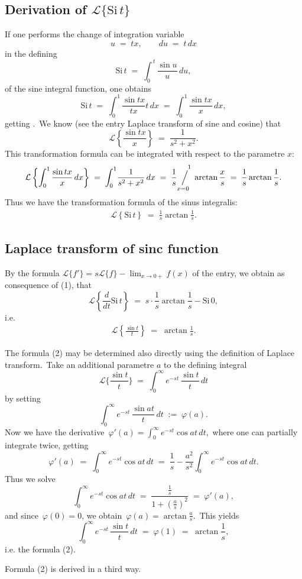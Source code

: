 \documentclass[12pt]{article}
\newcommand{\sijoitus}[2]%
{\operatornamewithlimits{\Big/}_{\!\!\!#1}^{\,#2}}
\begin{document}
  
\subsection{Derivation of $\mathcal{L}\{\mathrm{Si}\,t\}$}

If one performs the change of integration variable
$$u \;=\; tx, \qquad du \;=\; t\,dx$$
in the defining 
$$\mathrm{Si}\,t \;=\; \int_0^{\,t}\!\frac{\sin{u}}{u}\,du,$$
of the sine integral function, one obtains
$$\mathrm{Si}\,t \;=\; \int_0^1\frac{\sin{tx}}{tx}t\,dx \;=\; \int_0^1\frac{\sin{tx}}{x}\,dx,$$
getting  .\, We know (see the entry Laplace transform of sine and cosine) that
$$\mathcal{L}\left\{\frac{\sin{tx}}{x}\right\} \;=\; 
\frac{1}{s^2+x^2}.$$
This transformation formula can be integrated with respect to the parametre $x$:
$$\mathcal{L}\left\{\int_0^1\frac{\sin{tx}}{x}\,dx\right\} 
\;=\; \int_0^1\!\frac{1}{s^2+x^2}\,dx \;=\;
\frac{1}{s}\sijoitus{x=0}{\quad 1}\;\arctan\frac{x}{s} \;=\; 
\frac{1}{s}\arctan\frac{1}{s}.$$
Thus we have the transformation formula of the sinus integralis:
\begin{align}
\mathcal{L}\left\{\mathrm{Si}\,t\right\} \;=\; \frac{1}{s}\arctan\frac{1}{s}.
\end{align}

\subsection{Laplace transform of sinc function}

By the formula \;$\mathcal{L}\{f'\} = s \mathcal{L}\{f\}-\lim_{x \to 0+}f(x)$\; of the  entry,
we obtain as consequence of (1), that
$$\mathcal{L}\left\{\frac{d}{dt}\mathrm{Si}\,t\right\} \;=\; s\cdot\frac{1}{s}\arctan\frac{1}{s}-\mathrm{Si}\,0,$$
i.e.
\begin{align}
\mathcal{L}\left\{\frac{\sin{t}}{t}\right\} \;=\; \arctan\frac{1}{s}.
\end{align}


The formula (2) may be determined also directly using the definition of Laplace transform.\, Take an additional parametre $a$ to the defining integral 
$$\mathcal{L}\{\frac{\sin{t}}{t}\} \;=\; \int_0^\infty e^{-st}\,\frac{\sin t}{t}\,dt$$
by setting
$$\int_0^\infty e^{-st}\,\frac{\sin{at}}{t}\,dt \;:=\; \varphi(a).$$
Now we have the derivative \,$\varphi'(a) = \int_0^\infty e^{-st}\cos{at}\,dt$,\, where one can partially integrate twice, getting 
$$\varphi'(a) \;=\; \int_0^\infty e^{-st}\cos{at}\,dt \;=\; \frac{1}{s}-\frac{a^2}{s^2}\int_0^\infty e^{-st}
\cos{at}\,dt.$$
Thus we solve
$$\int_0^\infty e^{-st}\cos{at}\,dt \;=\; \frac{\frac{1}{s}}{1+\left(\frac{a}{s}\right)^2} \;=\; \varphi'(a),$$
and since\, $\varphi(0) = 0$, we obtain\, $\displaystyle\varphi(a) = \arctan\frac{a}{s}$.\, This yields
$$\int_0^\infty e^{-st}\,\frac{\sin t}{t}\,dt \;=\; \varphi(1) \;=\; \arctan\frac{1}{s},$$
i.e. the formula (2).

Formula (2) is derived  in a third way.
\end{document}
